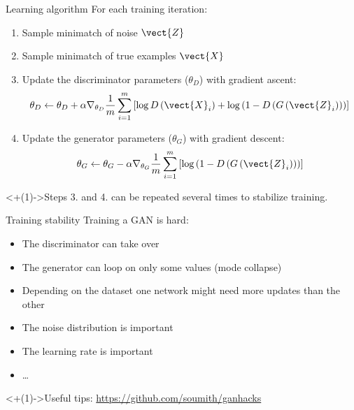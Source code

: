 \begin{frame}{Learning algorithm}
  For each training iteration:

  \begin{enumerate}[<+(1)->]
    \item Sample minimatch of noise $\vect{Z}$
    \item Sample minimatch of true examples $\vect{X}$
    \item Update the discriminator parameters ($\theta_D$) with gradient ascent:
    \[
      \theta_D \leftarrow \theta_D + \alpha \nabla_{\theta_D} \frac{1}{m} \sum_{i=1}^m \left[
        \log D\left(\vect{X}_i\right) + \log\left(1 - D\left(G\left(\vect{Z}_i\right)\right)\right)
      \right]
    \]
    \item Update the generator parameters ($\theta_G$) with gradient descent:
    \[
      \theta_G \leftarrow \theta_G - \alpha \nabla_{\theta_G} \frac{1}{m} \sum_{i=1}^m \left[
        \log\left(1 - D\left(G\left(\vect{Z}_i\right)\right)\right)
      \right]
    \]
  \end{enumerate}
  \onslide<+(1)->{Steps 3. and 4. can be repeated several times to stabilize training.}
\end{frame}

\begin{frame}{Training stability}
  Training a GAN is hard:

  \begin{itemize}[<+(1)->]
    \item The discriminator can take over
    \item The generator can loop on only some values (mode collapse)
    \item Depending on the dataset one network might need more updates than the other
    \item The noise distribution is important
    \item The learning rate is important
    \item …
  \end{itemize}

  \onslide<+(1)->{Useful tips: \url{https://github.com/soumith/ganhacks}}
\end{frame}
